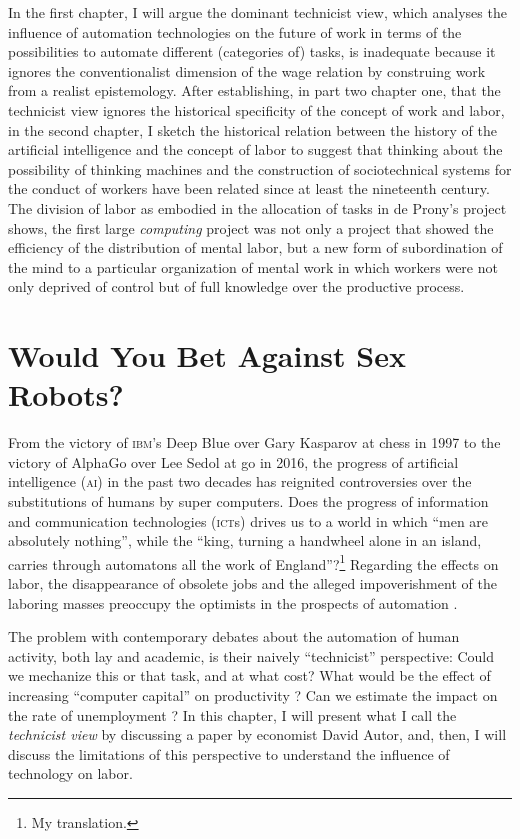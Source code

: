 \documentclass[version=last,draft=false,paper=A4,portrait,twoside=true,twocolumn=false,headinclude=false,footinclude=false,mpinclude=true,fontsize=12,BCOR=20mm,DIV=calc,pagesize=auto,open=right,chapterprefix=true,numbers=autoendperiod,headsepline=false,headings=twolinechapter,parskip=false]{scrbook}
\begin{document}
In the first chapter, I will argue the dominant technicist view, which
analyses the influence of automation technologies on the future of work in
terms of the possibilities to automate different (categories of) tasks, is
inadequate because it ignores the conventionalist dimension of the wage
relation by construing work from a realist epistemology. After
establishing, in part two chapter one, that the technicist view ignores the
historical specificity of the concept of work and labor, in the second
chapter, I sketch the historical relation between the history of the
artificial intelligence and the concept of labor to suggest that thinking
about the possibility of thinking machines and the construction of
sociotechnical systems for the conduct of workers have been related since
at least the nineteenth century. The division of labor as embodied in the
allocation of tasks in de Prony's project shows, the first large \emph{computing}
project was not only a project that showed the efficiency of the
distribution of mental labor, but a new form of subordination of the mind
to a particular organization of mental work in which workers were not only
deprived of control but of full knowledge over the productive process.

\chapter{Would You Bet Against Sex Robots?}
\label{sec:orga4a6acb}
From the victory of \textsc{ibm}'s Deep Blue over Gary Kasparov at chess in
1997 to the victory of AlphaGo over Lee Sedol at go in 2016, the progress
of artificial intelligence (\textsc{ai}) in the past two decades has
reignited controversies over the substitutions of humans by super
computers. Does the progress of information and communication technologies
(\textsc{ict}s) drives us to a world in which ``men are absolutely
nothing'', while the ``king, turning a handwheel alone in an island,
carries through automatons all the work of
England''\autocite[330]{sismondi1819_2}?\footnote{My translation.} Regarding the effects on
labor, the disappearance of obsolete jobs and the alleged impoverishment of
the laboring masses preoccupy the optimists in the prospects of automation
\autocite{ford2009}. 

The problem with contemporary debates about the automation of human
activity, both lay and academic, is their naively ``technicist''
perspective: Could we mechanize this or that task, and at what cost? What
would be the effect of increasing ``computer capital'' on productivity
\autocite{frey_osborne2013}? Can we estimate the impact on the rate of
unemployment \autocite{acemoglu_restrepo2018}? In this chapter, I will
present what I call the \emph{technicist view} by discussing a paper by economist
David Autor, and, then, I will discuss the limitations of this perspective
to understand the influence of technology on labor.
\end{document}
